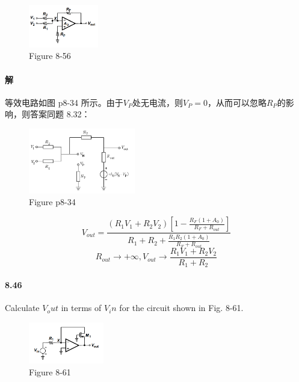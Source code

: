 \documentclass[hyperref, UTF8]{ctexart}
\begin{document}
    \begin{figure}[!htb]
        \centering
        \includegraphics[width=0.271\textwidth]{p8-56.png}
        \caption*{Figure 8-56}
    \end{figure}

\paragraph{解}
    等效电路如图 p8-34 所示。由于$V_P$处无电流，则$V_P=0$，从而可以忽略$R_P$的影响，则答案同题 8.32：

    \begin{figure}[!htb]
        \centering
        \includegraphics[width=0.415\textwidth]{p8-34-sol.png}
        \caption*{Figure p8-34}
    \end{figure}
        
    $$V_{out} = \frac{(R_1V_1+R_2V_2)\left[1-\frac{R_F(1+A_0)}{R_F+R_{out}}\right]}{R_1 + R_2 + \frac{R_1R_2(1+A_0)}{R_F+R_{out}}}$$
    $$R_{out} \rightarrow +\infty, V_{out} \rightarrow \frac{R_1V_1 + R_2V_2}{R_1+R_2}$$

\paragraph{8.46} \label{8.46}
    Calculate $V_out$ in terms of $V_in$ for the circuit shown in Fig. 8-61.

    \begin{figure}[!htb]
        \centering
        \includegraphics[width=0.292\textwidth]{p8-61.png}
        \caption*{Figure 8-61}
    \end{figure}
\end{document}
